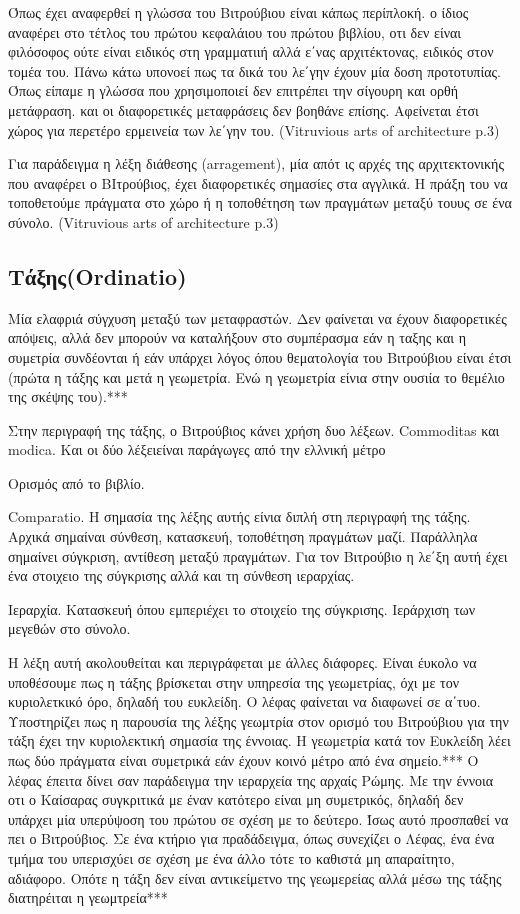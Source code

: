   Όπως έχει αναφερθεί η γλώσσα του Βιτρούβιου είναι κάπως περίπλοκή. ο ίδιος 
  αναφέρει στο τέτλος του πρώτου κεφαλάιου του πρώτου βιβλίου, οτι δεν είναι 
  φιλόσοφος ούτε είναι ειδικός στη γραμματιιή αλλά ε΄νας αρχιτέκτονας, ειδικός 
  στον τομέα του. Πάνω κάτω υπονοεί πως τα δικά του λε΄γην έχουν μία δοση 
  προτοτυπίας. Όπως είπαμε η γλώσσα που χρησιμοποιεί δεν επιτρέπει την σίγουρη 
  και ορθή μετάφραση. και οι διαφορετικές μεταφράσεις δεν βοηθάνε επίσης. 
  Αφείνεται έτσι χώρος για περετέρο ερμεινεία των λε΄γην του. (Vitruvious arts 
  of architecture p.3)
  
  Για παράδειγμα η λέξη διάθεσης (arragement), μία απότ ις αρχές της αρχιτεκτονικής που αναφέρει ο ΒΙτρούβιος, έχει διαφορετικές σημασίες στα αγγλικά. Η πράξη του να τοποθετούμε πράγματα στο χώρο ή η τοποθέτηση των πραγμάτων μεταξύ τουυς σε ένα σύνολο. (Vitruvious arts of architecture p.3)  
  
  \subsection{Τάξης(Ordinatio)}
  
Μία ελαφριά σύγχυση μεταξύ των μεταφραστών. Δεν φαίνεται να έχουν διαφορετικές απόψεις, αλλά δεν μπορούν να καταλήξουν στο συμπέρασμα εάν η ταξης και η συμετρία συνδέονται ή εάν υπάρχει λόγος όπου θεματολογία του Βιτρούβιου είναι έτσι (πρώτα η τάξης και μετά η γεωμετρία. Ενώ η γεωμετρία είνια στην ουσιία το θεμέλιο της σκέψης του).*** \cite[σ.~187]{vitruvius-lefas}

Στην περιγραφή της τάξης, ο Βιτρούβιος κάνει χρήση δυο λέξεων. Commoditas και modica. Και οι δύο λέξειείναι παράγωγες από την ελλνική μέτρο

Ορισμός από το βιβλίο. 

Comparatio. Η σημασία της λέξης αυτής είνια διπλή στη περιγραφή της τάξης. Αρχικά σημαίναι σύνθεση, κατασκευή, τοποθέτηση πραγμάτων μαζί. Παράλληλα σημαίνει σύγκριση, αντίθεση μεταξύ πραγμάτων. Για τον Βιτρούβιο η λε΄ξη αυτή έχει ένα στοιχειο της σύγκρισης αλλά και τη σύνθεση ιεραρχίας.

Ιεραρχία. Κατασκευή όπου εμπεριέχει το στοιχείο της σύγκρισης. Ιεράρχιση των μεγεθών στο σύνολο.

Η λέξη αυτή ακολουθείται και περιγράφεται με άλλες διάφορες. Είναι έυκολο να υποθέσουμε πως η τάξης βρίσκεται στην υπηρεσία της γεωμετρίας, όχι με τον κυριολετκικό όρο, δηλαδή του ευκλείδη. Ο λέφας φαίνεται να διαφωνεί σε α΄τυο. Υποστηρίζει πως η παρουσία της λέξης γεωμτρία στον ορισμό του Βιτρούβιου για την τάξη έχει την κυριολεκτική σημασία της έννοιας. Η γεωμετρία κατά τον Ευκλείδη λέει πως δύο πράγματα είναι συμετρικά εάν έχουν κοινό μέτρο από ένα σημείο.*** Ο λέφας έπειτα δίνει σαν παράδειγμα την ιεραρχεία της αρχαίς Ρώμης. Με την έννοια οτι ο Καίσαρας συγκριτικά με έναν κατότερο είναι μη συμετρικός,  δηλαδή δεν υπάρχει μία υπερύψοση του πρώτου σε σχέση με το δεύτερο. Ίσως αυτό προσπαθεί να πει ο Βιτρούβιος. Σε ένα κτήριο για πραδάδειγμα, όπως συνεχίζει ο Λέφας, ένα ένα τμήμα του υπερισχύει σε σχέση με ένα άλλο τότε το καθιστά μη απαραίτητο, αδιάφορο. Οπότε η τάξη δεν είναι αντικείμετνο της γεωμερείας αλλά μέσω της τάξης διατηρέιται η γεωμτρεία*** 

